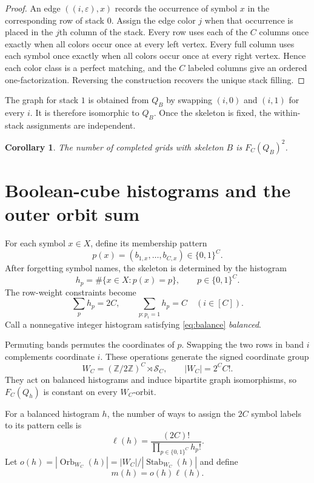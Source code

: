 \documentclass[11pt]{article}
\newtheorem{corollary}[theorem]{Corollary}
\theoremstyle{definition}
\theoremstyle{remark}
\newcommand{\Sym}{\mathcal{S}}
\newcommand{\Orb}{\mathop{\mathrm{Orb}}}
\begin{document}
\begin{proof}
An edge $((i,\varepsilon),x)$ records the occurrence of symbol $x$ in the
corresponding row of stack $0$.  Assign the edge color $j$ when that occurrence
is placed in the $j$th column of the stack.  Every row uses each of the $C$
columns once exactly when all colors occur once at every left vertex.  Every
full column uses each symbol once exactly when all colors occur once at every
right vertex.  Hence each color class is a perfect matching, and the $C$
labeled columns give an ordered one-factorization.  Reversing the construction
recovers the unique stack filling.
\end{proof}

The graph for stack $1$ is obtained from $Q_B$ by swapping $(i,0)$ and
$(i,1)$ for every $i$.  It is therefore isomorphic to $Q_B$.  Once the
skeleton is fixed, the within-stack assignments are independent.

\begin{corollary}
The number of completed grids with skeleton $B$ is $F_C(Q_B)^2$.
\label{cor:square}
\end{corollary}

\section{Boolean-cube histograms and the outer orbit sum}
\label{sec:outer}

For each symbol $x\in X$, define its membership pattern
\[
  p(x)=(b_{1,x},\ldots,b_{C,x})\in\{0,1\}^C.
\]
After forgetting symbol names, the skeleton is determined by the histogram
\[
  h_p=\#\{x\in X:p(x)=p\},\qquad p\in\{0,1\}^C.
\]
The row-weight constraints become
\begin{equation}
  \sum_{p}h_p=2C,
  \qquad
  \sum_{p:p_i=1}h_p=C\quad(i\in[C]).
  \label{eq:balance}
\end{equation}
Call a nonnegative integer histogram satisfying \eqref{eq:balance}
\emph{balanced}.

Permuting bands permutes the coordinates of $p$.  Swapping the two rows in
band $i$ complements coordinate $i$.  These operations generate the signed
coordinate group
\[
  W_C=(\mathbb Z/2\mathbb Z)^C\rtimes\Sym_C,
  \qquad |W_C|=2^C C!.
\]
They act on balanced histograms and induce bipartite graph isomorphisms, so
$F_C(Q_h)$ is constant on every $W_C$-orbit.

For a balanced histogram $h$, the number of ways to assign the $2C$ symbol
labels to its pattern cells is
\[
  \ell(h)=\frac{(2C)!}{\prod_{p\in\{0,1\}^C}h_p!}.
\]
Let $o(h)=|\Orb_{W_C}(h)|=|W_C|/|\operatorname{Stab}_{W_C}(h)|$ and define
\begin{equation}
  m(h)=o(h)\ell(h).
  \label{eq:multiplicity}
\end{equation}
\end{document}
